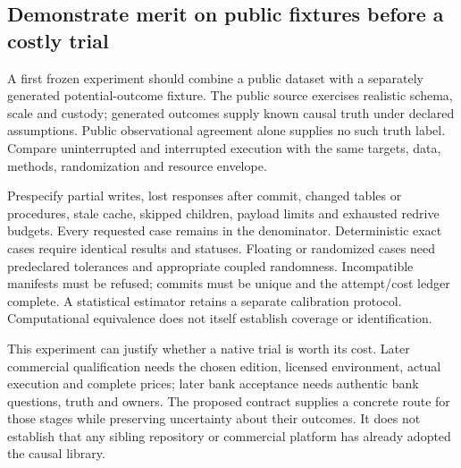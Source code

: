 \subsection{Demonstrate merit on public fixtures before a costly trial}

A first frozen experiment should combine a public dataset with a separately
generated potential-outcome fixture. The public source exercises realistic
schema, scale and custody; generated outcomes supply known causal truth under
declared assumptions. Public observational agreement alone supplies no such
truth label. Compare uninterrupted and interrupted execution with the same
targets, data, methods, randomization and resource envelope.

Prespecify partial writes, lost responses after commit, changed tables or
procedures, stale cache, skipped children, payload limits and exhausted redrive
budgets. Every requested case remains in the denominator. Deterministic exact
cases require identical results and statuses. Floating or randomized cases
need predeclared tolerances and appropriate coupled randomness. Incompatible
manifests must be refused; commits must be unique and the attempt/cost ledger
complete. A statistical estimator retains a separate calibration protocol.
Computational equivalence does not itself establish coverage or identification.

This experiment can justify whether a native trial is worth its cost. Later
commercial qualification needs the chosen edition, licensed environment,
actual execution and complete prices; later bank acceptance needs authentic
bank questions, truth and owners. The proposed contract supplies a concrete
route for those stages while preserving uncertainty about their outcomes.
It does not establish that any sibling repository or commercial platform has
already adopted the causal library.
